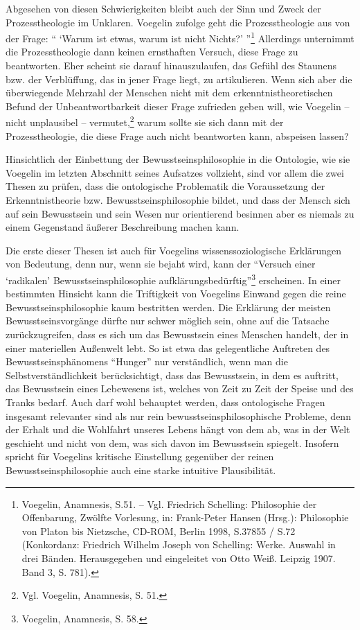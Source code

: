 Abgesehen von diesen Schwierigkeiten bleibt auch der Sinn und Zweck der
Prozesstheologie im Unklaren. Voegelin zufolge geht die Prozesstheologie aus
von der Frage: "` `Warum ist etwas, warum ist nicht Nichts?'
"'\footnote{Voegelin, Anamnesis, S.51. -- Vgl. Friedrich Schelling: Philosophie
  der Offenbarung, Zwölfte Vorlesung, in: Frank-Peter Hansen (Hrsg.):
  Philosophie von Platon bis Nietzsche, CD-ROM, Berlin 1998, S.37855 / S.72
  (Konkordanz: Friedrich Wilhelm Joseph von Schelling: Werke. Auswahl in drei
  Bänden. Herausgegeben und eingeleitet von Otto Weiß. Leipzig 1907.  Band 3,
  S. 781).} Allerdings unternimmt die Prozesstheologie dann keinen ernsthaften
Versuch, diese Frage zu beantworten. Eher scheint sie darauf hinauszulaufen,
das Gefühl des Staunens bzw. der Verblüffung, das in jener Frage liegt, zu
artikulieren. Wenn sich aber die überwiegende Mehrzahl der Menschen nicht mit
dem erkenntnistheoretischen Befund der Unbeantwortbarkeit dieser Frage
zufrieden geben will, wie Voegelin -- nicht unplausibel --
vermutet,\footnote{Vgl.  Voegelin, Anamnesis, S. 51.} warum sollte sie sich
dann mit der Prozesstheologie, die diese Frage auch nicht beantworten kann,
abspeisen lassen?

Hinsichtlich der Einbettung der Bewusstseinsphilosophie in die Ontologie,
wie sie Voegelin im letzten Abschnitt seines Aufsatzes vollzieht, sind
vor allem die zwei Thesen zu prüfen, dass die ontologische Problematik
die Voraussetzung der Erkenntnistheorie bzw. Bewusstseinsphilosophie
bildet, und dass der Mensch sich auf sein Bewusstsein und sein Wesen nur
orientierend besinnen aber es niemals zu einem Gegenstand äußerer
Beschreibung machen kann.

Die erste dieser Thesen ist auch für Voegelins wissenssoziologische
Erklärungen von Bedeutung, denn nur, wenn sie bejaht wird, kann der "`Versuch
einer `radikalen' Bewusstseinsphilosophie
aufklärungsbedürftig"'\footnote{Voegelin, Anamnesis, S. 58.} erscheinen. In
einer bestimmten Hinsicht kann die Triftigkeit von Voegelins Einwand gegen die
reine Bewusstseinsphilosophie kaum bestritten werden. Die Erklärung der
meisten Bewusstseinsvorgänge dürfte nur schwer möglich sein, ohne auf die
Tatsache zurückzugreifen, dass es sich um das Bewusstsein eines Menschen
handelt, der in einer materiellen Außenwelt lebt. So ist etwa das
gelegentliche Auftreten des Bewusstseinsphänomens "`Hunger"' nur verständlich,
wenn man die Selbstverständlichkeit berücksichtigt, dass das Bewusstsein, in
dem es auftritt, das Bewusstsein eines Lebewesens ist, welches von Zeit zu Zeit
der Speise und des Tranks bedarf. Auch darf wohl behauptet werden, dass
ontologische Fragen insgesamt relevanter sind als nur rein
bewusstseinsphilosophische Probleme, denn der Erhalt und die Wohlfahrt unseres
Lebens hängt von dem ab, was in der Welt geschieht und nicht von dem, was sich
davon im Bewusstsein spiegelt. Insofern spricht für Voegelins kritische
Einstellung gegenüber der reinen Bewusstseinsphilosophie auch eine starke
intuitive Plausibilität.

